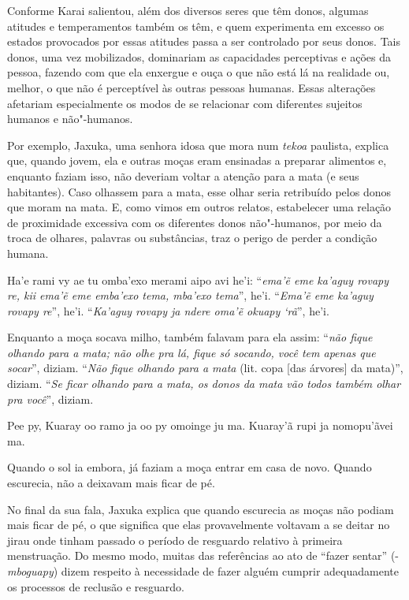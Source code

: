 Conforme Karai salientou, além dos diversos seres que têm donos, algumas
atitudes e temperamentos também os têm, e quem experimenta em excesso
os estados provocados por essas atitudes passa a ser controlado por
seus donos. Tais donos, uma vez mobilizados, dominariam as capacidades
perceptivas e ações da pessoa, fazendo com que ela enxergue e ouça o
que não está lá na realidade ou, melhor, o que não é perceptível às
outras pessoas humanas. Essas alterações afetariam especialmente os
modos de se relacionar com diferentes sujeitos humanos e não"-humanos.

Por exemplo, Jaxuka, uma senhora idosa que mora num \emph{tekoa} paulista,
explica que, quando jovem, ela e outras moças eram ensinadas a preparar
alimentos e, enquanto faziam isso, não deveriam voltar a atenção para a
mata (e seus habitantes). Caso olhassem para a mata, esse olhar seria
retribuído pelos donos que moram na mata. E, como vimos em outros
relatos, estabelecer uma relação de proximidade excessiva com os
diferentes donos não"-humanos, por meio da troca de olhares, palavras ou
substâncias, traz o perigo de perder a condição humana. 

\bigskip

\begin{paracol}{2}
\footnotesize
\bigskip
Ha'e rami vy ae tu omba'exo merami aipo avi he'i: ``\emph{ema'ẽ eme
ka'aguy rovapy re, kii ema'ẽ eme emba'exo tema, mba'exo tema}'', he'i.
``\emph{Ema'ẽ eme ka'aguy rovapy re}'', he'i. ``\emph{Ka'aguy rovapy ja
ndere oma'ẽ okuapy `rã}'', he'i.

\switchcolumn
Enquanto a moça socava milho, também falavam para ela assim: ``\emph{não
fique olhando para a mata; não olhe pra lá, fique só socando, você tem
apenas que socar}'', diziam. ``\emph{Não fique olhando para a mata}
(lit. copa [das árvores] da mata)'', diziam. ``\emph{Se ficar
olhando para a mata, os donos da mata vão todos também olhar pra
você}'', diziam.

\switchcolumn
Pee py, Kuaray oo ramo ja oo py omoinge ju ma. Kuaray’ã rupi ja
nomopu’ãvei ma. 

\switchcolumn
Quando o sol ia embora, já faziam a moça entrar em casa de novo. Quando
escurecia, não a deixavam mais ficar de pé.
\end{paracol}

\bigskip

No final da sua fala, Jaxuka explica que quando escurecia as moças não
podiam mais ficar de pé, o que significa que elas provavelmente
voltavam a se deitar no jirau onde tinham passado o período de
resguardo relativo à primeira menstruação. Do mesmo modo, muitas das
referências ao ato de ``fazer sentar'' (-\emph{mboguapy}) dizem respeito à
necessidade de fazer alguém cumprir adequadamente os processos de
reclusão e resguardo. 

